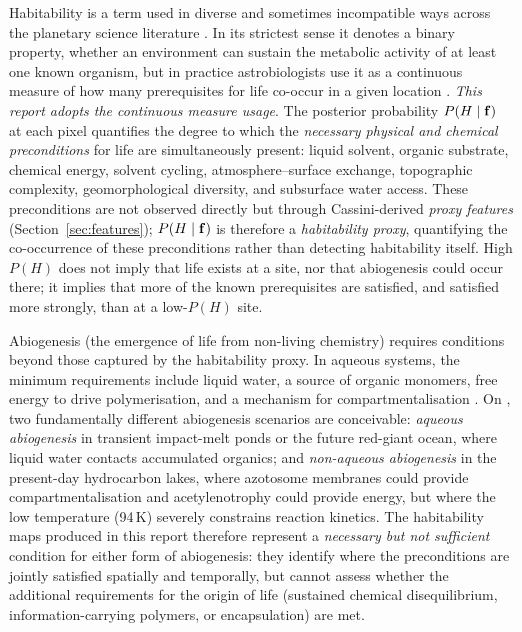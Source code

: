 Habitability is a term used in diverse and sometimes incompatible ways across the planetary science literature \citep{Cockell2016}.  In its strictest sense it denotes a binary property, whether an environment can sustain the metabolic activity of at least one known organism, but in practice astrobiologists use it as a continuous measure of how many prerequisites for life co-occur in a given location \citep{Mendez2021}.  \textit{This report adopts the continuous measure usage}.  The posterior probability $P(H \mid \mathbf{f})$ at each pixel quantifies the degree to which the \textit{necessary physical and chemical preconditions} for life are simultaneously present: liquid solvent, organic substrate, chemical energy, solvent cycling, atmosphere--surface exchange, topographic complexity, geomorphological diversity, and subsurface water access.  These preconditions are not observed directly but through Cassini-derived \textit{proxy features} (Section~\ref{sec:features}); $P(H \mid \mathbf{f})$ is therefore a \textit{habitability proxy}, quantifying the co-occurrence of these preconditions rather than detecting habitability itself.  High $P(H)$ does not imply that life exists at a site, nor that abiogenesis could occur there; it implies that more of the known prerequisites are satisfied, and satisfied more strongly, than at a low-$P(H)$ site.

Abiogenesis (the emergence of life from non-living chemistry) requires conditions beyond those captured by the habitability proxy.  In aqueous systems, the minimum requirements include liquid water, a source of organic monomers, free energy to drive polymerisation, and a mechanism for compartmentalisation \citep{Ruiz-Mirazo2014}.  On \titan{}, two fundamentally different abiogenesis scenarios are conceivable: \textit{aqueous abiogenesis} in transient impact-melt ponds or the future red-giant ocean, where liquid water contacts accumulated organics; and \textit{non-aqueous abiogenesis} in the present-day hydrocarbon lakes, where azotosome membranes \citep{Stevenson2015} could provide compartmentalisation and acetylenotrophy \citep{McKaySmith2005} could provide energy, but where the low temperature (94\,K) severely constrains reaction kinetics.  The habitability maps produced in this report therefore represent a \textit{necessary but not sufficient} condition for either form of abiogenesis: they identify where the preconditions are jointly satisfied spatially and temporally, but cannot assess whether the additional requirements for the origin of life (sustained chemical disequilibrium, information-carrying polymers, or encapsulation) are met.

